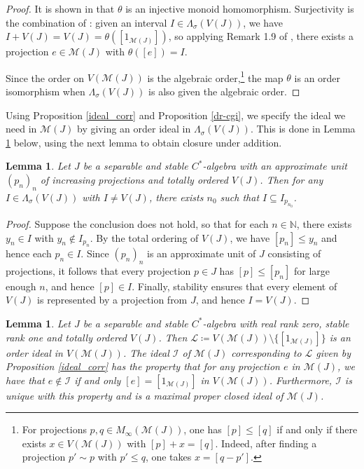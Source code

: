 \documentclass[reqno]{amsart}
\newtheorem{lem}[thm]{Lemma}
\theoremstyle{definition}
\theoremstyle{remark}
\numberwithin{equation}{section}
\theoremstyle{definition}
\newcommand{\calM}{\mathcal{M}}
\newcommand{\calL}{\mathcal{L}}
\newcommand{\calI}{\mathcal{I}}
\begin{document}
\begin{proof} 
It is shown in \cite[Lemma 1.6, Proposition 1.7]{Goodearl} that $\theta$ is an injective monoid homomorphism. Surjectivity is the combination of  \cite[Lemma 1.8 and Remark 1.9]{Goodearl}: given an interval $I\in \Lambda_\sigma(V(J))$, we have $I+V(J)=V(J)=\theta([1_{\mathcal M(J)}])$, so applying Remark 1.9 of \cite{Goodearl}, there exists a projection $e\in \calM(J)$ with $\theta([e])=I$.

Since the order on $V(\calM(J))$ is the algebraic order,\footnote{For projections $p,q\in M_\infty(\calM(J))$, one has $[p]\leq [q]$ if and only if there exists $x\in V(\calM(J))$ with $[p]+x=[q]$. Indeed, after finding a projection $p'\sim p$ with $p'\leq q$, one takes $x=[q-p']$.} the map $\theta$ is an order isomorphism when $\Lambda_\sigma(V(J))$ is also given the algebraic order.
\end{proof} 

Using Proposition \ref{ideal_corr} and Proposition \ref{dr-cgi}, we specify the ideal we need in $\calM(J)$ by giving an order ideal in $\Lambda_\sigma(V(J))$. This is done in Lemma \ref{proj-ideal} below, using the next lemma to obtain closure under addition.

\begin{lem} \label{non-dr-bound} 
Let $J$ be a separable and stable $C^*$-algebra with an approximate unit $(p_{n})_n$ of increasing projections and totally ordered $V(J)$. Then for any $I\in \Lambda_{\sigma}(V(J))$ with $I \neq V(J)$, there exists $n_{0}$ such that $I \subseteq I_{p_{n_{0}}}$. 
\end{lem} 

\begin{proof}
Suppose the conclusion does not hold, so that for each $n\in\mathbb N$, there exists $y_n\in I$ with $y_n\notin I_{p_n}$. By the total ordering of $V(J)$, we have $[p_n]\leq y_n$ and hence each $p_n\in I$. Since $(p_n)_n$ is an approximate unit of $J$ consisting of projections, it follows that every projection $p\in J$ has $[p]\leq [p_n]$ for large enough $n$, and hence $[p]\in I$. Finally, stability ensures that every element of $V(J)$ is represented by a projection from $J$, and hence $I=V(J)$.
\end{proof} 

\begin{lem} 
\label{proj-ideal} 
Let $J$ be a separable and stable $C^*$-algebra with real rank zero, stable rank one and totally ordered $V(J)$. Then $\calL\coloneqq V(\mathcal M(J))\setminus\{[1_{\calM(J)}]\}$ is an order ideal in $V(\calM(J))$. The ideal $\calI$ of $\calM(J)$ corresponding to $\calL$ given by Proposition \ref{ideal_corr} has the property that for any projection $e$ in $\calM(J)$, we have that $e\notin \calI$ if and only $[e] = [1_{\calM(J)}]$ in $V(\calM(J))$. Furthermore, $\calI$ is unique with this property and is a maximal proper closed ideal of $\calM(J)$. 
\end{lem} 
\end{document}
